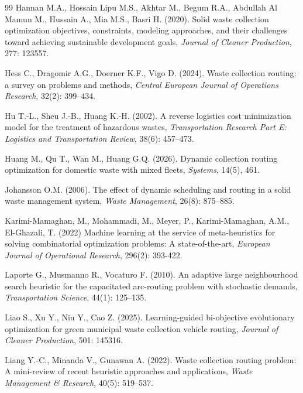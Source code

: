 \documentclass[authoryear,preprint,12pt]{elsarticle}
\begin{document}
\begin{thebibliography}{99}
Hannan M.A., Hossain Lipu M.S., Akhtar M., Begum R.A., Abdullah Al Mamun M., Hussain A., Mia M.S., Basri H. (2020). Solid waste collection optimization objectives, constraints, modeling approaches, and their challenges toward achieving sustainable development goals, \textit{Journal of Cleaner Production}, 277: 123557. 

Hess C., Dragomir A.G., Doerner K.F., Vigo D. (2024). Waste collection routing: a survey on problems and methods,
\textit{Central European Journal of Operations Research}, 32(2): 399--434.

Hu T.-L., Sheu J.-B., Huang K.-H. (2002). A reverse logistics cost minimization model for the treatment of hazardous wastes, \textit{Transportation Research Part E: Logistics and Transportation Review}, 38(6): 457--473. 

Huang M., Qu T., Wan M., Huang G.Q. (2026).
Dynamic collection routing optimization for domestic waste with mixed fleets, \textit{Systems}, 14(5), 461.


Johansson O.M. (2006). The effect of dynamic scheduling and routing in a solid waste management system, \textit{Waste Management}, 26(8): 875--885.

Karimi-Mamaghan, M., Mohammadi, M., Meyer, P., Karimi-Mamaghan, A.M., El-Ghazali, T. (2022) Machine learning at the service of meta-heuristics for solving combinatorial optimization problems: A state-of-the-art, \textit{European Journal of Operational Research}, 296(2): 393-422.

Laporte G., Musmanno R., Vocaturo F. (2010). An adaptive large neighbourhood search heuristic for the capacitated arc-routing
problem with stochastic demands, \textit{Transportation Science}, 44(1): 125--135.

Liao S., Xu Y., Niu Y., Cao Z. (2025). Learning-guided bi-objective evolutionary optimization for green municipal waste collection vehicle routing, \textit{Journal of Cleaner Production}, 501: 145316.

Liang  Y.-C., Minanda V., Gunawan A. (2022).  Waste collection routing problem:  A mini-review of recent heuristic approaches and applications, \textit{Waste Management \& Research}, 40(5): 519--537.


\end{thebibliography}
\end{document}
